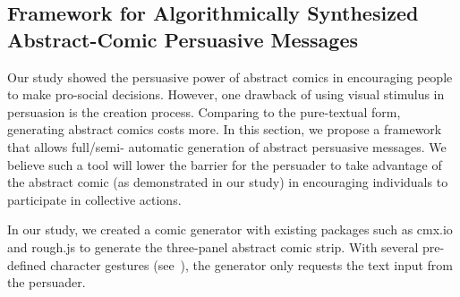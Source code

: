 
 \subsection{Framework for Algorithmically Synthesized Abstract-Comic Persuasive Messages}
 Our study showed the persuasive power of abstract comics in encouraging people to make pro-social decisions. However, one drawback of using visual stimulus in persuasion is the creation process. Comparing to the pure-textual form, generating abstract comics costs more. In this section, we propose a framework that allows full/semi- automatic generation of abstract persuasive messages. We believe such a tool will lower the barrier for the persuader to take advantage of the abstract comic (as demonstrated in our study) in encouraging individuals to participate in collective actions.

 In our study, we created a comic generator with existing packages such as cmx.io and rough.js to generate the three-panel abstract comic strip. With several pre-defined character gestures (see~), the generator only requests the text input from the persuader.  


